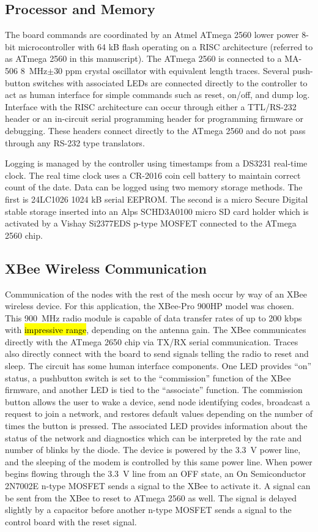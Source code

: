 \documentclass[journal]{IEEEtran}
\begin{document}
\subsection{Processor and Memory}
The board commands are coordinated by an Atmel ATmega 2560 lower power 8-bit microcontroller with 64 kB flash operating on a RISC architecture (referred to as ATmega 2560 in this manuscript).  The ATmega 2560 is connected to a MA-506 \SI{8}{\mega\hertz}$\pm$30 ppm crystal oscillator with equivalent length traces.  Several push-button switches with associated LEDs are connected directly to the controller to act as human interface for simple commands such as reset, on/off, and dump log.  Interface with the RISC architecture can occur through either a TTL/RS-232 header or an in-circuit serial programming header for programming firmware or debugging.  These headers connect directly to the ATmega 2560 and do not pass through any RS-232 type translators.  

Logging is managed by the controller using timestamps from a DS3231 real-time clock.  The real time clock uses a CR-2016 coin cell battery to maintain correct count of the date.  Data can be logged using two memory storage methods.  The first is 24LC1026 1024 kB serial EEPROM.  The second is a micro Secure Digital stable storage inserted into an Alps SCHD3A0100 micro SD card holder which is activated by a Vishay Si2377EDS p-type MOSFET connected to the ATmega 2560 chip.

\subsection{XBee Wireless Communication}
Communication of the nodes with the rest of the mesh occur by way of an XBee wireless device.  For this application, the XBee-Pro 900HP model was chosen.  This \SI{900}{\mega\hertz} radio module is capable of data transfer rates of up to 200 kbps with \hl{impressive range}, depending on the antenna gain.  The XBee communicates directly with the ATmega 2650 chip via TX/RX serial communication.  Traces also directly connect with the board to send signals telling the radio to reset and sleep.  The circuit has some human interface components.  One LED provides ``on'' status, a pushbutton switch is set to the ``commission'' function of the XBee firmware, and another LED is tied to the ``associate'' function.  The commission button allows the user to wake a device, send node identifying codes, broadcast a request to join a network, and restores default values depending on the number of times the button is pressed.  The associated LED provides information about the status of the network and diagnostics which can be interpreted by the rate and number of blinks by the diode.  The device is powered by the \SI{3.3}{\volt} power line, and the sleeping of the modem is controlled by this same power line.  When power begins flowing through the \SI{3.3}{\volt} line from an OFF state, an On Semiconductor 2N7002E n-type MOSFET sends a signal to the XBee to activate it.  A signal can be sent from the XBee to reset to ATmega 2560 as well. The signal is delayed slightly by a capacitor before another n-type MOSFET sends a signal to the control board with the reset signal.
\end{document}
